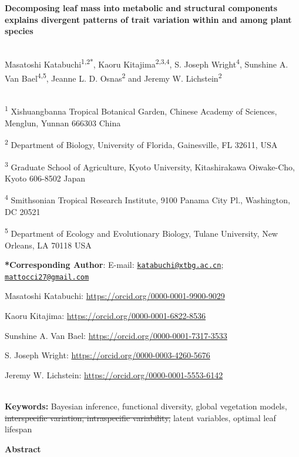 \documentclass[
  12pt,
  letterpaper,
  DIV=11,
  numbers=noendperiod]{scrartcl}
\author{}
\date{}
\providecommand{\DIFdel}[1]{{\protect\color{red}\sout{#1}}}                      %
\providecommand{\DIFdelbegin}{} %
\providecommand{\DIFdelend}{} %
\newcommand{\DIFscaledelfig}{0.5}
\newlength{\DIFdelgraphicswidth} %
\newlength{\DIFdelgraphicsheight} %
\newcommand{\DIFdelincludegraphics}[2][]{%
\sbox{\DIFdelgraphicsbox}{\DIFOincludegraphics[#1]{#2}}%
\settoboxwidth{\DIFdelgraphicswidth}{\DIFdelgraphicsbox} %
\settoboxtotalheight{\DIFdelgraphicsheight}{\DIFdelgraphicsbox} %
\scalebox{\DIFscaledelfig}{%
\parbox[b]{\DIFdelgraphicswidth}{\usebox{\DIFdelgraphicsbox}\\[-\baselineskip] \rule{\DIFdelgraphicswidth}{0em}}\llap{\resizebox{\DIFdelgraphicswidth}{\DIFdelgraphicsheight}{%
\setlength{\unitlength}{\DIFdelgraphicswidth}%
\begin{picture}(1,1)%
\thicklines\linethickness{2pt} %
{\color[rgb]{1,0,0}\put(0,0){\framebox(1,1){}}}%
{\color[rgb]{1,0,0}\put(0,0){\line( 1,1){1}}}%
{\color[rgb]{1,0,0}\put(0,1){\line(1,-1){1}}}%
\end{picture}%
}\hspace*{3pt}}} %
} %
\DeclareRobustCommand{\DIFdelbegin}{\DIFOdelbegin \let\includegraphics\DIFdelincludegraphics} %
\DeclareRobustCommand{\DIFdelend}{\DIFOaddend \let\includegraphics\DIFOincludegraphics} %
\begin{document}
\textbf{Decomposing leaf mass into metabolic and structural components
explains divergent patterns of trait variation within and among plant
species}\\
\strut \\
Masatoshi Katabuchi\textsuperscript{1,2*}, Kaoru
Kitajima\textsuperscript{2,3,4}, S. Joseph Wright\textsuperscript{4},
Sunshine A. Van Bael\textsuperscript{4,5}, Jeanne L. D.
Osnas\textsuperscript{2} and Jeremy W. Lichstein\textsuperscript{2}\\
\strut \\
\textsuperscript{1} Xishuangbanna Tropical Botanical Garden, Chinese
Academy of Sciences, Menglun, Yunnan 666303 China

\textsuperscript{2} Department of Biology, University of Florida,
Gainesville, FL 32611, USA

\textsuperscript{3} Graduate School of Agriculture, Kyoto University,
Kitashirakawa Oiwake-Cho, Kyoto 606-8502 Japan

\textsuperscript{4} Smithsonian Tropical Research Institute, 9100 Panama
City Pl., Washington, DC 20521

\textsuperscript{5} Department of Ecology and Evolutionary Biology,
Tulane University, New Orleans, LA 70118 USA

\textbf{*Corresponding Author}: E-mail:
\href{mailto:katabuchi@xtbg.ac.cn}{\nolinkurl{katabuchi@xtbg.ac.cn}};
\href{mailto:mattocci27@gmail.com}{\nolinkurl{mattocci27@gmail.com}}

Masatoshi Katabuchi: \url{https://orcid.org/0000-0001-9900-9029}

Kaoru Kitajima: \url{https://orcid.org/0000-0001-6822-8536}

Sunshine A. Van Bael: \url{https://orcid.org/0000-0001-7317-3533}

S. Joseph Wright: \url{https://orcid.org/0000-0003-4260-5676}

Jeremy W. Lichstein: \url{https://orcid.org/0000-0001-5553-6142}\\
\strut \\
\textbf{Keywords:} Bayesian inference, functional diversity, global
vegetation models, \DIFdelbegin \DIFdel{interspecific variation, intraspecific variability,
}\DIFdelend latent variables, optimal leaf lifespan

\textbf{Abstract}
\end{document}
